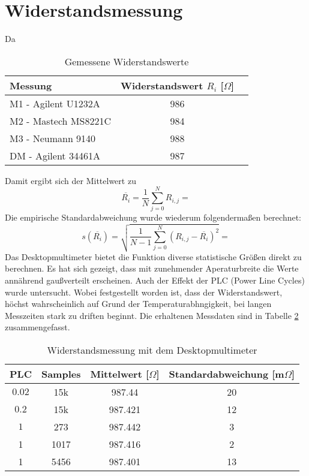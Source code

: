 \section{Widerstandsmessung}
Da 
\begin{table}[h]
	\centering
	\begin{tabular}{|l|c|c|}
	\hline 
	Messung & Widerstandswert $R_i$ [$\Omega$]\\ 
	\hline 
	M1 - Agilent U1232A & 986		\\ 
	\hline 
	M2 - Mastech MS8221C & 984		\\ 
	\hline 
	M3 - Neumann 9140 & 988		\\ 
	\hline 
	DM - Agilent 34461A & 987		\\ 
	\hline 
	\end{tabular}
	\caption{Gemessene Widerstandswerte}
	\label{tb:widerstandswerte}
\end{table} \noindent
Damit ergibt sich der Mittelwert zu
\begin{equation}
	\overline{R_i} = \frac{1}{N} \sum\limits_{j=0}^N R_{i,j} = 
	\label{eq:mittelw}
\end{equation}
Die empirische Standardabweichung wurde wiederum folgendermaßen berechnet:
\begin{equation}
	s(\overline{R_i}) = \sqrt{\frac{1}{N-1} \sum\limits_{j=0}^N (R_{i,j} - \overline{R_i})^2}= 
	\label{eq:stdabw}
\end{equation}
Das Desktopmultimeter bietet die Funktion diverse statistische Größen direkt zu berechnen. Es hat sich gezeigt, dass mit zunehmender Aperaturbreite die Werte annährend gaußverteilt erscheinen. Auch der Effekt der PLC (Power Line Cycles) wurde untersucht. Wobei festgestellt worden ist, dass der Widerstandswert, höchst wahrscheinlich auf Grund der Temperaturabhngigkeit, bei langen Messzeiten stark zu driften beginnt. Die erhaltenen Messdaten sind in Tabelle \ref{tb:widerstand_dm} zusammengefasst.
\begin{table}[h]
	\centering
	\begin{tabular}{|c|c|c|c|}
	\hline 
	PLC & Samples & Mittelwert [$\Omega$] & Standardabweichung [m$\Omega$] \\ 
	\hline 
	$0.02$ & 15k & 987.44 & 20 \\ 
	\hline 
	$0.2$ & 15k & 987.421 & 12 \\ 
	\hline 
	$1$ & 273 & 987.442 & 3 \\ 
	\hline 
	1 & 1017 & 987.416 & 2 \\ 
	\hline 
	1 & 5456 & 987.401 & 13 \\ 
	\hline 
	\end{tabular}
	\caption{Widerstandsmessung mit dem Desktopmultimeter}
	\label{tb:widerstand_dm}
\end{table}

